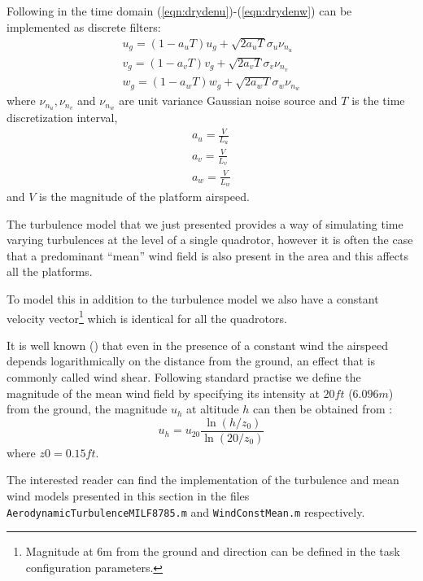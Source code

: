 \documentclass[a4paper,11pt]{report}
\begin{document}
Following \cite{milf8785c} in the time domain (\ref{eqn:drydenu})-(\ref{eqn:drydenw}) can be implemented as discrete filters:  
\begin{eqnarray}
u_g=(1-a_uT)u_g+\sqrt{2a_uT}\sigma_u\nu_{n_u}\\
v_g=(1-a_vT)v_g+\sqrt{2a_vT}\sigma_v\nu_{n_v}\\
w_g=(1-a_wT)w_g+\sqrt{2a_wT}\sigma_w\nu_{n_w}
\end{eqnarray}
where $\nu_{n_u},\nu_{n_v}$ and $\nu_{n_w}$ are unit variance Gaussian noise source and $T$ is the time discretization interval,  
\begin{eqnarray}
a_u=\frac{V}{L_u}\\ 
a_v=\frac{V}{L_v}\\ 
a_w=\frac{V}{L_w}
\end{eqnarray}
and $V$ is the magnitude of the platform airspeed.

The turbulence model that we just presented provides a way of simulating time varying turbulences at the level of a single quadrotor, however it is often the case that a predominant ``mean'' wind field is also present in the area and this affects all the platforms. 

To model this in addition to the turbulence model we also have a constant velocity vector\footnote{Magnitude at 6m from the ground and direction can be defined in the task configuration parameters.} which is identical for all the quadrotors. 

It is well known (\cite{milf8785c}) that even in the presence of a constant wind the airspeed depends logarithmically on the distance from the ground, an effect that is commonly called wind shear.
Following standard practise we define the magnitude of the mean wind field by specifying its intensity at $20ft$ ($6.096m$) from the ground, the magnitude $u_h$ at altitude $h$ can then be obtained from :
\begin{equation}
u_h = u_{20} \frac{\ln(h/z_0)}{\ln(20/z_0)}
\end{equation}
where $z0=0.15ft$.

The interested reader can find the implementation of the turbulence and mean wind models presented in this section in the files \texttt{AerodynamicTurbulenceMILF8785.m} and \texttt{WindConstMean.m} respectively.  



\end{document}
